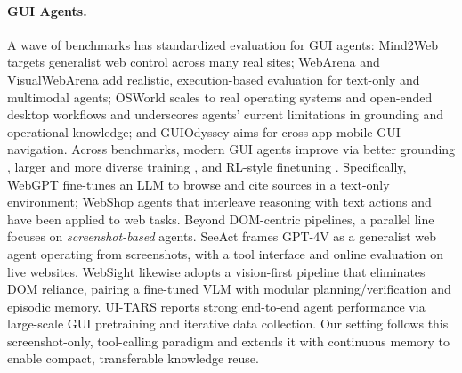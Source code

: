 \documentclass{article} %
\begin{document}
\paragraph{GUI Agents.}
A wave of benchmarks has standardized evaluation for GUI agents: Mind2Web \citep{mind2web} targets generalist web control across many real sites; WebArena \citep{zhou2023webarena} and VisualWebArena \citep{visualwebarena} add realistic, execution-based evaluation for text-only and multimodal agents; OSWorld \citep{osworld} scales to real operating systems and open-ended desktop workflows and underscores agents’ current limitations in grounding and operational knowledge; and GUIOdyssey \citep{guiodyssey} aims for cross-app mobile GUI navigation.
Across benchmarks, modern GUI agents improve via better grounding \citep{screenspotpro,osatlas}, larger and more diverse training \citep{uitars}, and RL-style finetuning \citep{luo2025guir1, lu2025uir1}.
Specifically, WebGPT \citep{WebGPT} fine-tunes an LLM to browse and cite sources in a text-only environment; WebShop agents \citep{WebShop} that interleave reasoning with text actions and have been applied to web tasks. 
Beyond DOM-centric pipelines, a parallel line focuses on \emph{screenshot-based} agents. SeeAct \citep{zheng2024seeact_multimodal_mind2web} frames GPT-4V as a generalist web agent operating from screenshots, with a tool interface and online evaluation on live websites. WebSight \citep{bhathal2025websight} likewise adopts a vision-first pipeline that eliminates DOM reliance, pairing a fine-tuned VLM with modular planning/verification and episodic memory. UI-TARS \citep{uitars} reports strong end-to-end agent performance via large-scale GUI pretraining and iterative data collection. Our setting follows this screenshot-only, tool-calling paradigm and extends it with continuous memory to enable compact, transferable knowledge reuse.
\end{document}
